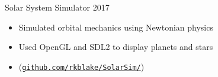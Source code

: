 \documentclass[line,margin]{res}
\begin{document}
\begin{resume}

\vspace{-8pt}
Solar System Simulator
\hfill 2017
	\begin{itemize} \itemsep -2pt
		\item Simulated orbital mechanics using Newtonian physics
		\item Used OpenGL and SDL2 to display planets and stars
		\item (\href{https://github.com/rkblake/SolarSim/}{\texttt{github.com/rkblake/SolarSim/}})
	\end{itemize}





\end{resume}
\end{document}

